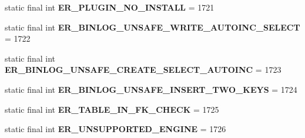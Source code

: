 \begin{DoxyCompactItemize}
\item 
\mbox{\label{classcom_1_1mysql_1_1cj_1_1exceptions_1_1_mysql_error_numbers_a98205f9da2e63a05deba688dc9861167}} 
static final int {\bfseries E\+R\+\_\+\+P\+L\+U\+G\+I\+N\+\_\+\+N\+O\+\_\+\+I\+N\+S\+T\+A\+LL} = 1721
\item 
\mbox{\label{classcom_1_1mysql_1_1cj_1_1exceptions_1_1_mysql_error_numbers_acb7c00581f96ddb52e2837002546484a}} 
static final int {\bfseries E\+R\+\_\+\+B\+I\+N\+L\+O\+G\+\_\+\+U\+N\+S\+A\+F\+E\+\_\+\+W\+R\+I\+T\+E\+\_\+\+A\+U\+T\+O\+I\+N\+C\+\_\+\+S\+E\+L\+E\+CT} = 1722
\item 
\mbox{\label{classcom_1_1mysql_1_1cj_1_1exceptions_1_1_mysql_error_numbers_a7a010882fcdb092f6148bc393f3d1d39}} 
static final int {\bfseries E\+R\+\_\+\+B\+I\+N\+L\+O\+G\+\_\+\+U\+N\+S\+A\+F\+E\+\_\+\+C\+R\+E\+A\+T\+E\+\_\+\+S\+E\+L\+E\+C\+T\+\_\+\+A\+U\+T\+O\+I\+NC} = 1723
\item 
\mbox{\label{classcom_1_1mysql_1_1cj_1_1exceptions_1_1_mysql_error_numbers_a0ae88458e1b66ab797d93158cc6286dc}} 
static final int {\bfseries E\+R\+\_\+\+B\+I\+N\+L\+O\+G\+\_\+\+U\+N\+S\+A\+F\+E\+\_\+\+I\+N\+S\+E\+R\+T\+\_\+\+T\+W\+O\+\_\+\+K\+E\+YS} = 1724
\item 
\mbox{\label{classcom_1_1mysql_1_1cj_1_1exceptions_1_1_mysql_error_numbers_a35334e64956bdb1de991fc2421ce5ded}} 
static final int {\bfseries E\+R\+\_\+\+T\+A\+B\+L\+E\+\_\+\+I\+N\+\_\+\+F\+K\+\_\+\+C\+H\+E\+CK} = 1725
\item 
\mbox{\label{classcom_1_1mysql_1_1cj_1_1exceptions_1_1_mysql_error_numbers_a3859265ef7273fa476e4710312d2f751}} 
static final int {\bfseries E\+R\+\_\+\+U\+N\+S\+U\+P\+P\+O\+R\+T\+E\+D\+\_\+\+E\+N\+G\+I\+NE} = 1726
\item 
\mbox{\label{classcom_1_1mysql_1_1cj_1_1exceptions_1_1_mysql_error_numbers_a0b2abdf1c45b86ca322cb2246fd9f54d}} 

\end{DoxyCompactItemize}
